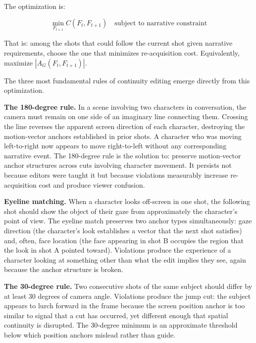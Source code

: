 \documentclass[12pt, a4paper]{article}
\theoremstyle{plain}
\theoremstyle{definition}
\theoremstyle{remark}
\newcommand{\AG}{A_G}
\begin{document}
The optimization is:

\begin{equation}
  \min_{F_{t+1}} C(F_t, F_{t+1})
  \quad \text{subject to narrative constraint}
  \label{eq:reacquisition_min}
\end{equation}

That is: among the shots that could follow the current shot
given narrative requirements, choose the one that minimizes
re-acquisition cost. Equivalently, maximize $|\AG(F_t,
F_{t+1})|$.

The three most fundamental rules of continuity editing
emerge directly from this optimization.

\medskip
\noindent\textbf{The 180-degree rule.} In a scene involving
two characters in conversation, the camera must remain on one
side of an imaginary line connecting them. Crossing the line
reverses the apparent screen direction of each character,
destroying the motion-vector anchors established in prior
shots. A character who was moving left-to-right now appears
to move right-to-left without any corresponding narrative
event. The 180-degree rule is the solution to: preserve
motion-vector anchor structures across cuts involving
character movement. It persists not because editors were
taught it but because violations measurably increase
re-acquisition cost and produce viewer confusion.

\medskip
\noindent\textbf{Eyeline matching.} When a character looks
off-screen in one shot, the following shot should show the
object of their gaze from approximately the character's point
of view. The eyeline match preserves two anchor types
simultaneously: gaze direction (the character's look
establishes a vector that the next shot satisfies) and, often,
face location (the face appearing in shot B occupies the
region that the look in shot A pointed toward). Violations
produce the experience of a character looking at something
other than what the edit implies they see, again because the
anchor structure is broken.

\medskip
\noindent\textbf{The 30-degree rule.} Two consecutive shots
of the same subject should differ by at least 30 degrees of
camera angle. Violations produce the jump cut: the subject
appears to lurch forward in the frame because the screen
position anchor is too similar to signal that a cut has
occurred, yet different enough that spatial continuity is
disrupted. The 30-degree minimum is an approximate threshold
below which position anchors mislead rather than guide.
\end{document}

